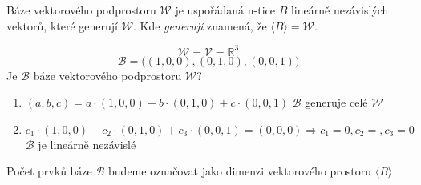 \begin{definition}
    Báze vektorového podprostoru $\mathcal{W}$ je uspořádaná n-tice $B$ lineárně
    nezávislých vektorů, které generují $\mathcal{W}$.
    Kde \textit{generují} znamená, že $\langle B \rangle = \mathcal{W}$.
\end{definition}

\begin{example}
    $$\mathcal{W} = \mathcal{V} = \mathbb{R}^3$$
    $$\mathcal{B} = \big((1, 0, 0), (0, 1, 0), (0, 0, 1)\big)$$
    Je $\mathcal{B}$ báze vektorového podprostoru $\mathcal{W}$?
    \begin{enumerate}
        \item $(a, b, c) = a \cdot(1, 0, 0) + b \cdot (0, 1, 0) + c \cdot (0, 0, 1)$ \hfill
            $\mathcal{B}$ generuje celé $\mathcal{W}$
        \item $c_1 \cdot(1, 0, 0) + c_2 \cdot (0, 1, 0) + c_3 \cdot (0, 0, 1) = (0, 0, 0)
            \Rightarrow c_1 = 0, c_2 =, c_3 = 0$ \hfill $\mathcal{B}$ je lineárně nezávislé
    \end{enumerate}
\end{example}

\begin{definition}
    Počet prvků báze $\mathcal{B}$ budeme označovat jako dimenzi vektorového
        prostoru $\langle B \rangle$
\end{definition}


